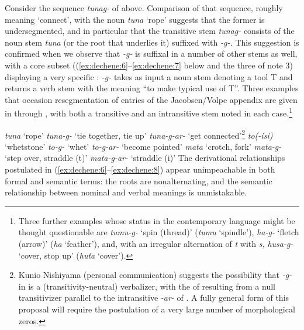 \documentclass[output=paper,
modfonts
]{LSP/langsci}
\begin{document}
Consider the sequence \textit{tunag-} of  above. Comparison of that
sequence, roughly meaning `connect', with the noun \textit{tuna} `rope'
suggests that the former is undersegmented, and in particular that the
transitive stem \textit{tunag-} consists of the noun stem \textit{tuna} (or
the root that underlies it) suffixed with \textit{-g-.} This suggestion is
confirmed when we observe that \textit{-g-} is suffixal in a number of
other stems as well, with a core subset ((\ref{ex:dechene:6}--\ref{ex:dechene:7} below and the three of
note 3) displaying a very specific : \textit{-g-} takes as input
a noun stem denoting a tool T and returns a verb stem with the meaning
``to make typical use of T''. Three examples that occasion
resegmentation of entries of the Jacobsen/Volpe appendix are given in
 through , with both a transitive and an intransitive stem noted
in each case.\footnote{Three further examples whose status in the
  contemporary language might be thought questionable are \textit{tumu-g-}
  `spin (thread)' (\textit{tumu} `spindle'), \textit{ha-g-} `fletch (arrow)'
  (\textit{ha} `feather'), and, with an irregular alternation of \textit{t}
  with \textit{s,} \textit{husa-g-} `cover, stop up' (\textit{huta} `cover').}
  
\newpage   
\ea \label{ex:dechene:6}
	 \ea \label{ex:dechene:6a} \textit{tuna} `rope'
	 \ex \label{ex:dechene:6b} \textit{tuna-g-} `tie together, tie up'
	 \ex \label{ex:dechene:6c} \textit{tuna-g-ar-} `get connected'\footnote{Kunio Nishiyama (personal
  	communication) suggests the possibility that \textit{-g-} in  is a
  	(transitivity-neutral) verbalizer, with the  of 
  	resulting from a null transitivizer parallel to the intransitive
  	\textit{-ar-} of . A fully general form of this proposal will
  	require the postulation of a very large number of morphological zeros.}
	\z
\ex \label{ex:dechene:7} 
	 \ea \label{ex:dechene:7a} \textit{to(-isi)} `whetstone'
	 \ex \label{ex:dechene:7b} \textit{to-g-} `whet'
	 \ex \label{ex:dechene:7c} \textit{to-g-ar-} `become pointed'
	\z
\ex \label{ex:dechene:8} 
	 \ea \label{ex:dechene:8a} \textit{mata} `crotch, fork'
	 \ex \label{ex:dechene:8b} \textit{mata-g-} `step over, straddle (t)'
	 \ex \label{ex:dechene:8c} \textit{mata-g-ar-} `straddle (i)'
	\z
\z
The derivational relationships postulated in (\ref{ex:dechene:6}--\ref{ex:dechene:8}) appear
unimpeachable in both formal and semantic terms: the roots are
nonalternating, and the semantic relationship between nominal and verbal
meanings is unmistakable.
\end{document}
